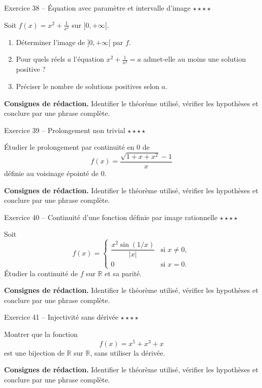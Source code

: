 \documentclass[11pt,a4paper]{article}
\newcommand{\etoiles}[1]{\hfill\textcolor{orangeprepa}{\textbf{#1}}}
\newcommand{\R}{\mathbb{R}}
\begin{document}
\begin{exobox}{Exercice 38 -- Équation avec paramètre et intervalle d'image \etoiles{$\star\star\star\star$}}

Soit $f(x)=x^2+\frac1{x^2}$ sur $]0,+\infty[$.
\begin{enumerate}
\item Déterminer l'image de $]0,+\infty[$ par $f$.
\item Pour quels réels $a$ l'équation $x^2+\frac1{x^2}=a$ admet-elle au moins une solution positive ?
\item Préciser le nombre de solutions positives selon $a$.
\end{enumerate}

\medskip
\textbf{Consignes de rédaction.} Identifier le théorème utilisé, vérifier les hypothèses et conclure par une phrase complète.
\end{exobox}


\begin{exobox}{Exercice 39 -- Prolongement non trivial \etoiles{$\star\star\star\star$}}

Étudier le prolongement par continuité en $0$ de
\[
f(x)=\frac{\sqrt{1+x+x^2}-1}{x}
\]
définie au voisinage épointé de $0$.

\medskip
\textbf{Consignes de rédaction.} Identifier le théorème utilisé, vérifier les hypothèses et conclure par une phrase complète.
\end{exobox}


\begin{exobox}{Exercice 40 -- Continuité d'une fonction définie par image rationnelle \etoiles{$\star\star\star\star$}}

Soit
\[
f(x)=\begin{cases}
\dfrac{x^2\sin(1/x)}{|x|} & \text{si }x\neq0,\\
0 & \text{si }x=0.
\end{cases}
\]
Étudier la continuité de $f$ sur $\R$ et sa parité.

\medskip
\textbf{Consignes de rédaction.} Identifier le théorème utilisé, vérifier les hypothèses et conclure par une phrase complète.
\end{exobox}


\begin{exobox}{Exercice 41 -- Injectivité sans dérivée \etoiles{$\star\star\star\star$}}

Montrer que la fonction
\[
f(x)=x^5+x^3+x
\]
est une bijection de $\R$ sur $\R$, sans utiliser la dérivée.

\medskip
\textbf{Consignes de rédaction.} Identifier le théorème utilisé, vérifier les hypothèses et conclure par une phrase complète.
\end{exobox}
\end{document}
